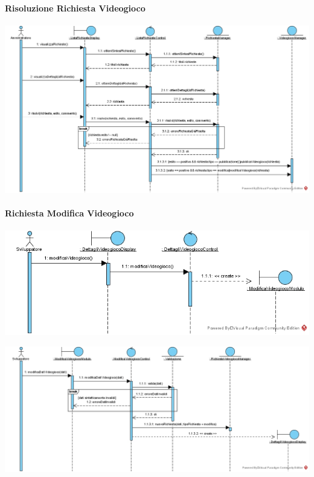 \paragraph{Risoluzione Richiesta Videogioco}
\begin{center}
\includegraphics[width=\textwidth,height=\textheight,keepaspectratio]{Figure/SequenceDiagrams/RisoluzioneRichiestaVideogioco.jpg}
\end{center}

\newpage
\paragraph{Richiesta Modifica Videogioco}
\begin{center}
\includegraphics[width=\textwidth,height=\textheight,keepaspectratio]{Figure/SequenceDiagrams/RichiestaModificaVideogiocoEntry.jpg}
\end{center}

\begin{center}
\includegraphics[width=\textwidth,height=\textheight,keepaspectratio]{Figure/SequenceDiagrams/RichiestaModificaVideogiocoInner.jpg}
\end{center}

